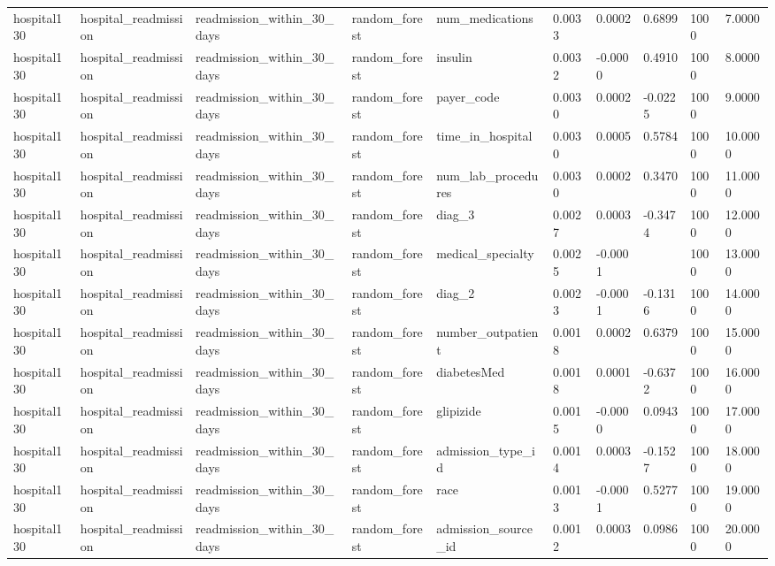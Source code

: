 \begin{tabular}{llllllllll}
hospital130 & hospital\_readmission & readmission\_within\_30\_days & random\_forest & num\_medications & 0.0033 & 0.0002 & 0.6899 & 1000 & 7.0000 \\
hospital130 & hospital\_readmission & readmission\_within\_30\_days & random\_forest & insulin & 0.0032 & -0.0000 & 0.4910 & 1000 & 8.0000 \\
hospital130 & hospital\_readmission & readmission\_within\_30\_days & random\_forest & payer\_code & 0.0030 & 0.0002 & -0.0225 & 1000 & 9.0000 \\
hospital130 & hospital\_readmission & readmission\_within\_30\_days & random\_forest & time\_in\_hospital & 0.0030 & 0.0005 & 0.5784 & 1000 & 10.0000 \\
hospital130 & hospital\_readmission & readmission\_within\_30\_days & random\_forest & num\_lab\_procedures & 0.0030 & 0.0002 & 0.3470 & 1000 & 11.0000 \\
hospital130 & hospital\_readmission & readmission\_within\_30\_days & random\_forest & diag\_3 & 0.0027 & 0.0003 & -0.3474 & 1000 & 12.0000 \\
hospital130 & hospital\_readmission & readmission\_within\_30\_days & random\_forest & medical\_specialty & 0.0025 & -0.0001 &  & 1000 & 13.0000 \\
hospital130 & hospital\_readmission & readmission\_within\_30\_days & random\_forest & diag\_2 & 0.0023 & -0.0001 & -0.1316 & 1000 & 14.0000 \\
hospital130 & hospital\_readmission & readmission\_within\_30\_days & random\_forest & number\_outpatient & 0.0018 & 0.0002 & 0.6379 & 1000 & 15.0000 \\
hospital130 & hospital\_readmission & readmission\_within\_30\_days & random\_forest & diabetesMed & 0.0018 & 0.0001 & -0.6372 & 1000 & 16.0000 \\
hospital130 & hospital\_readmission & readmission\_within\_30\_days & random\_forest & glipizide & 0.0015 & -0.0000 & 0.0943 & 1000 & 17.0000 \\
hospital130 & hospital\_readmission & readmission\_within\_30\_days & random\_forest & admission\_type\_id & 0.0014 & 0.0003 & -0.1527 & 1000 & 18.0000 \\
hospital130 & hospital\_readmission & readmission\_within\_30\_days & random\_forest & race & 0.0013 & -0.0001 & 0.5277 & 1000 & 19.0000 \\
hospital130 & hospital\_readmission & readmission\_within\_30\_days & random\_forest & admission\_source\_id & 0.0012 & 0.0003 & 0.0986 & 1000 & 20.0000 \\

\end{tabular}
